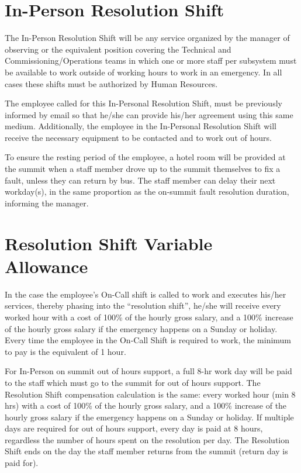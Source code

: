 \section{In-Person Resolution Shift}

The In-Person Resolution Shift will be any service organized by the manager of observing or the equivalent position covering the Technical and Commissioning/Operations teams in which one or more staff per subsystem must be available to work outside of working hours to work in an emergency.
In all cases these shifts must be authorized by Human Resources.

The employee called for this In-Personal Resolution Shift, must be previously informed by email so that he/she can provide his/her agreement using this same medium. Additionally, the employee in the In-Personal Resolution Shift will receive the necessary equipment to be contacted and to work out of hours.

To ensure the resting period of the employee, a hotel room will be provided at the summit when a staff member drove up to the summit themselves to fix a fault, unless they can return by bus.  The staff member can delay their next workday(s), in the same proportion as the on-summit fault resolution duration, informing the manager.

\section{Resolution Shift Variable Allowance}

In the case the employee's On-Call shift is called to work and executes his/her services, thereby phasing into the ``resolution shift'', he/she will receive every worked hour with a cost of 100\% of the hourly gross salary, and a 100\% increase of the hourly gross salary if the emergency happens on a Sunday or holiday. 
Every time the employee in the On-Call Shift is required to work, the minimum to pay is the equivalent of 1 hour.

For In-Person on summit out of hours support, a full 8-hr work day will be paid to the staff which must go to the summit for out of hours support.  
The Resolution Shift compensation calculation is the same:  every worked hour (min 8 hrs) with a cost of 100\% of the hourly gross salary, and a 100\% increase of the hourly gross salary if the emergency happens on a Sunday or holiday.  
If multiple days are required for out of hours support, every day is paid at 8 hours, regardless the number of hours spent on the resolution per day.  
The Resolution Shift ends on the day the staff member returns from the summit (return day is paid for).

